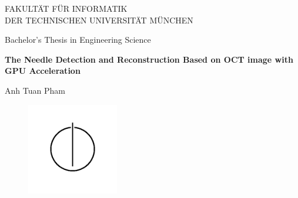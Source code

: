 \thispagestyle{empty}

\vspace{4cm}
\begin{center}
  \oTUM{4cm}

  \vspace{5mm}
  \huge FAKULT{\"A}T F{\"U}R INFORMATIK\\
  \vspace{0.5cm}
  \large DER TECHNISCHEN UNIVERSIT{\"A}T M{\"U}NCHEN\\
  \vspace{1mm}

\end{center}


\vspace{15mm}
\begin{center}

  {\Large Bachelor's Thesis in Engineering Science}

  \vspace{20mm}

  {\huge\textbf{The Needle Detection and Reconstruction Based on OCT image with GPU Acceleration}}\\%


  \vspace{15mm}


  {\LARGE  Anh Tuan Pham}


  \vspace{5mm}
  


  \begin{figure}[h!]
    \centering
    \includegraphics[width=4cm]{styles/informat.png}
  \end{figure}


\end{center}